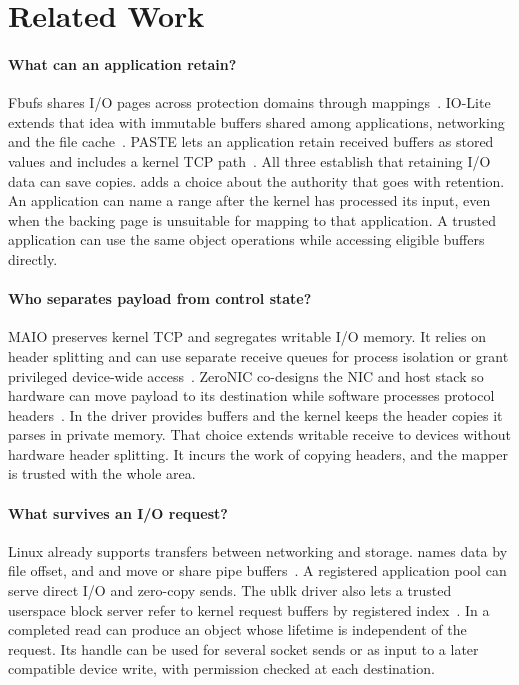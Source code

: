 \section{Related Work}
\label{sec:related}

\paragraph{What can an application retain?} Fbufs shares I/O pages across
protection domains through mappings~\cite{fbufs}. IO-Lite extends that idea
with immutable buffers shared among applications, networking and the file
cache~\cite{iolite}. PASTE lets an application retain received buffers as
stored values and includes a kernel TCP path~\cite{paste}. All three establish
that retaining I/O data can save copies. \sys adds a choice about the authority
that goes with retention. An application can name a range after the kernel has
processed its input, even when the backing page is unsuitable for mapping to
that application. A trusted application can use the same object operations
while accessing eligible buffers directly.

\paragraph{Who separates payload from control state?} MAIO preserves kernel
TCP and segregates writable I/O memory. It relies on header splitting and
can use separate receive queues for process isolation or grant privileged
device-wide access~\cite{maio}. ZeroNIC co-designs the NIC and host stack so
hardware can move payload to its destination while software processes protocol
headers~\cite{zeronic}. In \sys the driver provides buffers and the kernel
keeps the header copies it parses in private memory. That choice extends
writable receive to devices without hardware header splitting. It incurs the
work of copying headers, and the mapper is trusted with the whole area.

\paragraph{What survives an I/O request?} Linux already supports transfers
between networking and storage. \sendfile names data by file offset,
and \splice and  move or share pipe buffers~\cite{sendfileapi,spliceapi}.
A registered application pool can serve direct I/O and zero-copy sends.
The ublk driver also lets a trusted userspace block server refer to kernel
request buffers by registered index~\cite{ublkzc}. In \sys a completed read
can produce an object whose lifetime is independent of the request. Its handle
can be used for several socket sends or as input to a later compatible device
write, with permission checked at each destination.

